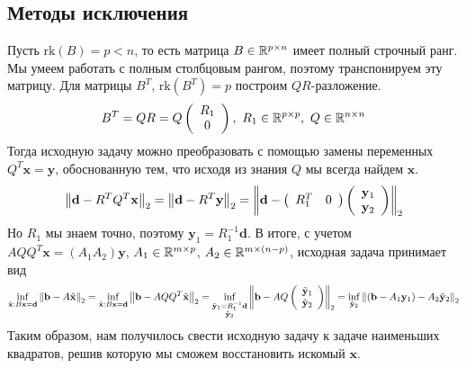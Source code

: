 \subsection*{Методы исключения}
Пусть $\text{rk}(B)=p<n$, то есть матрица $B\in\mathbb{R}^{p\times n}$ имеет полный строчный ранг.
Мы умеем работать с полным столбцовым рангом, поэтому транспонируем
эту матрицу. Для матрицы $B^T$, $\text{rk}(B^T)=p$ построим $QR$-разложение.
\[B^T=QR=Q\left(\begin{array}{c}
      R_1 \\
      0
    \end{array}\right),\ R_1\in\mathbb{R}^{p\times p},\ Q\in\mathbb{R}^{n\times n}\]
Тогда исходную задачу можно преобразовать с помощью замены переменных $Q^T\mathbf{x}=\mathbf{y}$,
обоснованную тем, что исходя из знания $Q$ мы всегда найдем $\mathbf{x}$.
\[\left\lVert\mathbf{d}-R^TQ^T\mathbf{x}\right\rVert_2=\left\lVert\mathbf{d}-R^T\mathbf{y}\right\rVert_2
  =\left\lVert\mathbf{d}-\left(\begin{array}{cc} R_1^T & 0 \end{array}\right)
    \left(\begin{array}{c}\mathbf{y}_1 \\ \mathbf{y}_2 \end{array}\right)\right\rVert_2\]
Но $R_1$ мы знаем точно, поэтому $\mathbf{y}_1 = R_1^{-1}\mathbf{d}$.
В итоге, с учетом $AQQ^T\mathbf{x}=(A_1A_2)\mathbf{y}$, $A_1\in\mathbb{R}^{m\times p}$, $A_2\in\mathbb{R}^{m\times (n-p)}$, исходная задача принимает вид
\[\inf_{\tilde{\mathbf{x}}:B\mathbf{x}=\mathbf{d}}\left\lVert\mathbf{b}-A\tilde{\mathbf{x}}\right\rVert_2
  =\inf_{\tilde{\mathbf{x}}:B\mathbf{x}=\mathbf{d}}\left\lVert\mathbf{b}-AQQ^T\tilde{\mathbf{x}}\right\rVert_2
  =\inf_{\substack{\tilde{\mathbf{y}}_1=R_1^{-1}\mathbf{d} \\ \tilde{\mathbf{y}}_2}}\left\lVert\mathbf{b}-AQ\left(\begin{array}{c}\tilde{\mathbf{y}}_1 \\ \tilde{\mathbf{y}}_2 \end{array}\right)\right\rVert_2
  =\inf_{\tilde{\mathbf{y}}_2}\left\lVert(\mathbf{b}-A_1\mathbf{y}_1) - A_2\tilde{\mathbf{y}}_2\right\rVert_2\]
Таким образом, нам получилось свести исходную задачу к задаче наименьших квадратов,
решив которую мы сможем восстановить искомый $\mathbf{x}$.

